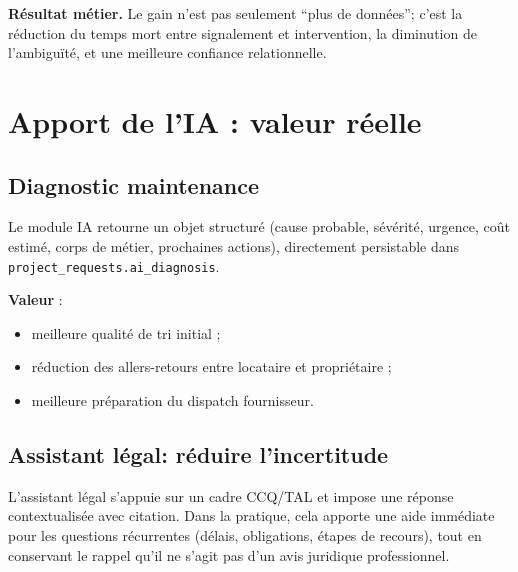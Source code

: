 \documentclass[11pt,a4paper]{article}
\begin{document}
\textbf{Résultat métier.} Le gain n'est pas seulement ``plus de données''; c'est la réduction du temps mort entre signalement et intervention, la diminution de l'ambiguïté, et une meilleure confiance relationnelle.


\section{Apport de l'IA : valeur réelle}

\subsection{Diagnostic maintenance}

Le module IA retourne un objet structuré (cause probable, sévérité, urgence, coût estimé, corps de métier, prochaines actions), directement persistable dans \texttt{project\_requests.ai\_diagnosis}.

\textbf{Valeur} :
\begin{itemize}[leftmargin=1.4em]
  \item meilleure qualité de tri initial ;
  \item réduction des allers-retours entre locataire et propriétaire ;
  \item meilleure préparation du dispatch fournisseur.
\end{itemize}

\subsection{Assistant légal: réduire l'incertitude}

L'assistant légal s'appuie sur un cadre CCQ/TAL et impose une réponse contextualisée avec citation. Dans la pratique, cela apporte une aide immédiate pour les questions récurrentes (délais, obligations, étapes de recours), tout en conservant le rappel qu'il ne s'agit pas d'un avis juridique professionnel.
\end{document}
